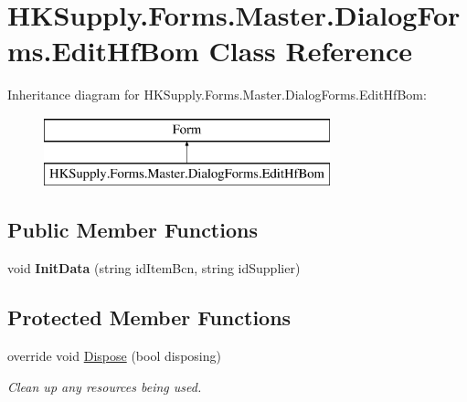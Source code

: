 \hypertarget{class_h_k_supply_1_1_forms_1_1_master_1_1_dialog_forms_1_1_edit_hf_bom}{}\section{H\+K\+Supply.\+Forms.\+Master.\+Dialog\+Forms.\+Edit\+Hf\+Bom Class Reference}
\label{class_h_k_supply_1_1_forms_1_1_master_1_1_dialog_forms_1_1_edit_hf_bom}
Inheritance diagram for H\+K\+Supply.\+Forms.\+Master.\+Dialog\+Forms.\+Edit\+Hf\+Bom\+:\begin{figure}[H]
\begin{center}
\leavevmode
\includegraphics[height=2.000000cm]{class_h_k_supply_1_1_forms_1_1_master_1_1_dialog_forms_1_1_edit_hf_bom}
\end{center}
\end{figure}
\subsection*{Public Member Functions}
\begin{DoxyCompactItemize}
\item 
\mbox{\label{class_h_k_supply_1_1_forms_1_1_master_1_1_dialog_forms_1_1_edit_hf_bom_a983b61cafc310ca60b63d29d0ee23935}} 
void {\bfseries Init\+Data} (string id\+Item\+Bcn, string id\+Supplier)
\end{DoxyCompactItemize}
\subsection*{Protected Member Functions}
\begin{DoxyCompactItemize}
\item 
override void \mbox{\hyperlink{class_h_k_supply_1_1_forms_1_1_master_1_1_dialog_forms_1_1_edit_hf_bom_a56a84e67848b0f496a4b7987f24d7fab}{Dispose}} (bool disposing)
\begin{DoxyCompactList}\small\item\em Clean up any resources being used. \end{DoxyCompactList}\end{DoxyCompactItemize}


